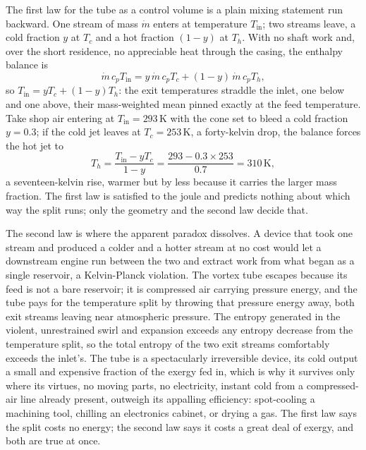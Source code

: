 The first law for the tube as a control volume is a plain mixing statement run
backward. One stream of mass $\dot m$ enters at temperature $T_{\text{in}}$; two
streams leave, a cold fraction $y$ at $T_c$ and a hot fraction $(1-y)$ at $T_h$.
With no shaft work and, over the short residence, no appreciable heat through the
casing, the enthalpy balance is
\[
\dot m\, c_p T_{\text{in}} = y\,\dot m\, c_p T_c + (1-y)\,\dot m\, c_p T_h,
\]
so $T_{\text{in}} = y T_c + (1-y) T_h$: the exit temperatures straddle the inlet,
one below and one above, their mass-weighted mean pinned exactly at the feed
temperature. Take shop air entering at $T_{\text{in}} = 293\,\si{\kelvin}$ with the
cone set to bleed a cold fraction $y = 0.3$; if the cold jet leaves at
$T_c = 253\,\si{\kelvin}$, a forty-kelvin drop, the balance forces the hot jet to
\[
T_h = \frac{T_{\text{in}} - y T_c}{1 - y} = \frac{293 - 0.3\times 253}{0.7} =
310\,\si{\kelvin},
\]
a seventeen-kelvin rise, warmer but by less because it carries the larger mass
fraction. The first law is satisfied to the joule and predicts nothing about which
way the split runs; only the geometry and the second law decide that.

The second law is where the apparent paradox dissolves. A device that took one
stream and produced a colder and a hotter stream at no cost would let a downstream
engine run between the two and extract work from what began as a single reservoir, a
Kelvin-Planck violation. The vortex tube escapes because its feed is not a bare
reservoir; it is compressed air carrying pressure energy, and the tube pays for the
temperature split by throwing that pressure energy away, both exit streams leaving
near atmospheric pressure. The entropy generated in the violent, unrestrained swirl
and expansion exceeds any entropy decrease from the temperature split, so the total
entropy of the two exit streams comfortably exceeds the inlet's. The tube is a
spectacularly irreversible device, its cold output a small and expensive fraction of
the exergy fed in, which is why it survives only where its virtues, no moving parts,
no electricity, instant cold from a compressed-air line already present, outweigh its
appalling efficiency: spot-cooling a machining tool, chilling an electronics
cabinet, or drying a gas. The first law says the split costs no energy; the second
law says it costs a great deal of exergy, and both are true at once.



